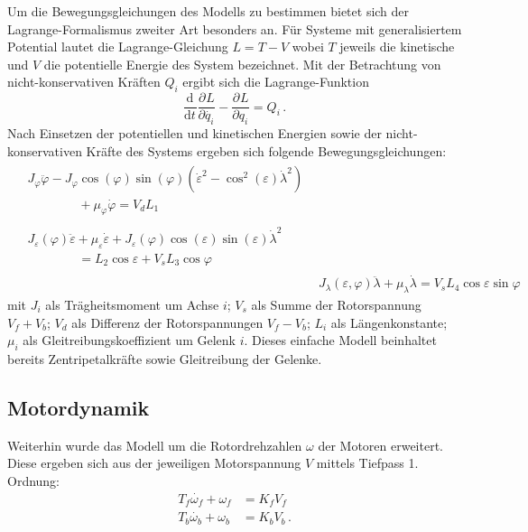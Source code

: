 \documentclass[10pt,twocolumn]{article}
\newcommand{\partiell}[3][]{\frac{\partial^{#1}#2}{\partial{#3}^{#1}}}
\newcommand{\diff}[3][]{\frac{\mathrm{d}^{#1}#2}{\mathrm{d}{#3}^{#1}}}
\begin{document}
	Um die Bewegungsgleichungen des Modells zu bestimmen bietet sich der Lagrange-Formalismus zweiter Art besonders an. Für Systeme mit generalisiertem Potential lautet die Lagrange-Gleichung $L = T -V$ wobei $T$ jeweils die kinetische und $V$ die potentielle Energie des System bezeichnet.
	Mit der Betrachtung von nicht-konservativen Kräften $Q_i$ ergibt sich die Lagrange-Funktion
	\begin{equation}\label{eq:lagrange}
	\diff{}{t} \partiell{L}{\dot{q_i}} - \partiell{L}{q_i}=Q_i\, .
	\end{equation}
	Nach Einsetzen der potentiellen und kinetischen Energien sowie der nicht-konservativen Kräfte des Systems ergeben sich folgende Bewegungsgleichungen:
	\begin{subequations}
		\begin{align}
		\begin{split}
		&J_\varphi \ddot{\varphi} - J_\varphi \cos (\varphi) \sin (\varphi) (\dot{\varepsilon}^2- \cos^2 (\varepsilon) \dot{\lambda}^2)\\
		&\qquad\qquad+ \mu_\varphi \dot{\varphi} = V_d L_1
		\end{split}
		\\
		\begin{split}		
		&J_\varepsilon(\varphi)\ddot{\varepsilon} + \mu_\varepsilon \dot{\varepsilon} + J_\varepsilon(\varphi) \cos (\varepsilon) \sin (\varepsilon) \dot{\lambda}^2\\
		&\qquad\qquad= L_2 \cos \varepsilon + V_s L_3 \cos \varphi
		\end{split}
		\\
		&J_\lambda(\varepsilon,\varphi) \ddot{\lambda} + \mu_\lambda \dot{\lambda} = V_s L_4 \cos \varepsilon \sin \varphi
		\end{align}
		\label{eq:lagrange_result}
	\end{subequations}
	mit $J_i$ als Trägheitsmoment um Achse $i$; $V_s$ als Summe der Rotorspannung $V_f + V_b$; $V_d$ als Differenz der Rotorspannungen $V_f - V_b$; $L_i$ als Längenkonstante; $\mu_i$ als Gleitreibungskoeffizient um Gelenk $i$. Dieses einfache Modell beinhaltet bereits Zentripetalkräfte sowie Gleitreibung der Gelenke.
	
	\subsection{Motordynamik} \label{sssec:motor}
	
	Weiterhin wurde das Modell um die Rotordrehzahlen $\omega$ der Motoren erweitert. Diese ergeben sich aus der jeweiligen Motorspannung $V$ mittels Tiefpass 1. Ordnung:
	\begin{subequations}
		\begin{align}
		T_f \dot{\omega_f} + \omega_f &= K_f V_f\\
		T_b \dot{\omega_b} + \omega_b &= K_b V_b\, .
		\end{align}
	\end{subequations}
	
\end{document}
